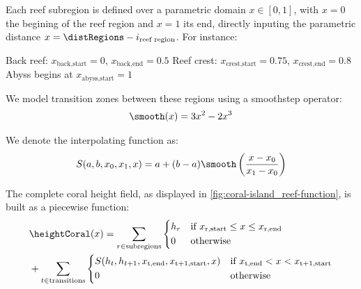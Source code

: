 Each reef subregion is defined over a parametric domain $x \in [0, 1]$, with $x=0$ the begining of the reef region and $x=1$ its end, directly inputing the parametric distance $x = \distRegions - i_{\text{reef region}}$. For instance:
\begin{Itemize}
    \Item{} Back reef: $x_{\text{back,start}} = 0$, $x_{\text{back,end}} = 0.5$
    \Item{} Reef crest: $x_{\text{crest,start}} = 0.75$, $x_{\text{crest,end}} = 0.8$
    \Item{} Abyss begins at $x_{\text{abyss,start}} = 1$
\end{Itemize}

We model transition zones between these regions using a smoothstep operator:
\begin{align}
    \smooth(x) = 3x^2 - 2x^3
\end{align}

We denote the interpolating function as:
\begin{align}
    S(a, b, x_0, x_1, x) = a + (b-a) \smooth\left(\frac{x - x_0}{x_1 - x_0}\right)
\end{align}

The complete coral height field, as displayed in \cref{fig:coral-island_reef-function}, is built as a piecewise function:
\begin{align}
    \label{eq:coral-island_full-reef-function}
    &\heightCoral(x) = \sum_{r \in \text{subregions}}{
    \begin{dcases}
        h_r & \text{if } x_{\text{r,start}} \leq x \leq x_{\text{r,end}} \\
        0 & \text{otherwise}
    \end{dcases}
    } \nonumber \\ 
    &+
    \sum_{t \in \text{transitions}} {
        \begin{dcases}
            S(h_{t}, h_{t+1}, x_{\text{t,end}}, x_{\text{t+1,start}}, x) & \text{if } x_{\text{t,end}} < x < x_{\text{t+1,start}} \\
            0 & \text{otherwise}
        \end{dcases}
    }
\end{align}




